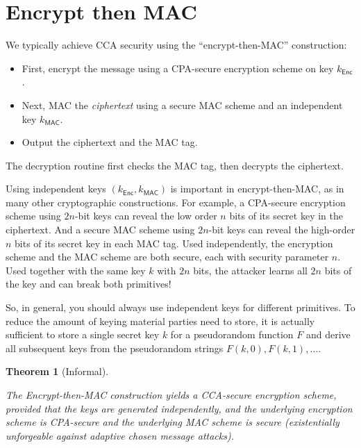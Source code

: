 \documentclass[
  letterpaper,
]{scrbook}
\theoremstyle{definition}
\theoremstyle{plain}
\theoremstyle{plain}
\newtheorem{theorem}{Theorem}[chapter]
\theoremstyle{remark}
\begin{document}
\section{Encrypt then MAC}\label{encrypt-then-mac}

We typically achieve CCA security using the ``encrypt-then-MAC''
construction:

\begin{itemize}
\item
  First, encrypt the message using a CPA-secure encryption scheme on key
  \(k_\mathsf{Enc}\).
\item
  Next, MAC the \emph{ciphertext} using a secure MAC scheme and an
  independent key \(k_\mathsf{MAC}\).

\item
  Output the ciphertext and the MAC tag.
\end{itemize}

The decryption routine first checks the MAC tag, then decrypts the
ciphertext.

Using independent keys \((k_\mathsf{Enc}, k_\mathsf{MAC})\) is important
in encrypt-then-MAC, as in many other cryptographic constructions. For
example, a CPA-secure encryption scheme using \(2n\)-bit keys can reveal
the low order \(n\) bits of its secret key in the ciphertext. And a
secure MAC scheme using \(2n\)-bit keys can reveal the high-order \(n\)
bits of its secret key in each MAC tag. Used independently, the
encryption scheme and the MAC scheme are both secure, each with security
parameter \(n\). Used together with the same key \(k\) with \(2n\) bits,
the attacker learns all \(2n\) bits of the key and can break both
primitives!

So, in general, you should always use independent keys for different
primitives. To reduce the amount of keying material parties need to
store, it is actually sufficient to store a single secret key \(k\) for
a pseudorandom function \(F\) and derive all subsequent keys from the
pseudorandom strings \(F(k, 0), F(k, 1), \dots\).

\begin{theorem}[Informal]\protect\hypertarget{thm-encrypt-then-mac}{}\label{thm-encrypt-then-mac}

The Encrypt-then-MAC construction yields a CCA-secure encryption scheme,
provided that the keys are generated independently, and the underlying
encryption scheme is CPA-secure and the underlying MAC scheme is secure
(existentially unforgeable against adaptive chosen message attacks).

\end{theorem}
\end{document}
